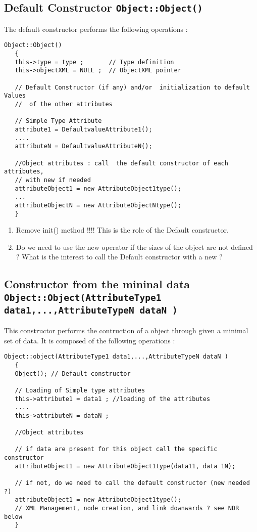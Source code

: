 \subsection{Default Constructor {\tt Object::Object() } }

The default constructor performs the following operations :
\begin{verbatim}
Object::Object()
   {
   this->type = type ;       // Type definition 
   this->objectXML = NULL ;  // ObjectXML pointer

   // Default Constructor (if any) and/or  initialization to default Values
   //  of the other attributes

   // Simple Type Attribute
   attribute1 = DefaultvalueAttribute1();
   ....
   attributeN = DefaultvalueAttributeN();

   //Object attributes : call  the default constructor of each attributes, 
   // with new if needed
   attributeObject1 = new AttributeObject1type();
   ...
   attributeObjectN = new AttributeObjectNtype();
   }
\end{verbatim} 

\begin{ndr}
  \begin{enumerate}
  \item Remove init() method !!!! This is the role of the Default constructor.
  \item Do we need to use the new operator if the sizes of the object are not defined ? What is the interest to call the Default constructor with a new ?
  \end{enumerate}

\end{ndr}

\subsection{Constructor from the mininal data {\small \tt Object::Object(AttributeType1 data1,...,AttributeTypeN dataN ) }}

This constructor performs  the contruction of a object through given a minimal set of data.  It is composed of the following operations :

\begin{verbatim}
Object::object(AttributeType1 data1,...,AttributeTypeN dataN )
   {
   Object(); // Default constructor

   // Loading of Simple type attributes
   this->attribute1 = data1 ; //loading of the attributes
   ....
   this->attributeN = dataN ;

   //Object attributes

   // if data are present for this object call the specific constructor
   attributeObject1 = new AttributeObject1type(data11, data 1N);

   // if not, do we need to call the default constructor (new needed ?)
   attributeObject1 = new AttributeObject1type();
   // XML Management, node creation, and link downwards ? see NDR below
   }
\end{verbatim} 

